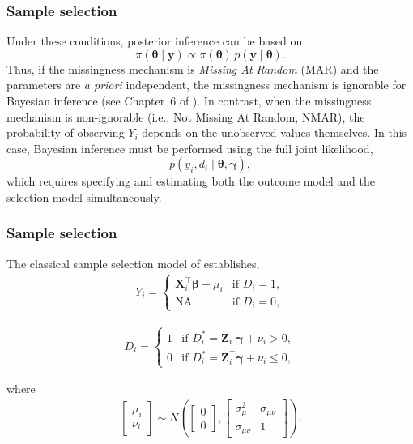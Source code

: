 \documentclass[12pt, compress]{beamer}
\begin{document}
\begin{frame}
	\frametitle{Sample selection}
Under these conditions, posterior inference can be based on
\[
\pi(\boldsymbol{\theta}\mid \mathbf{y}) 
\propto \pi(\boldsymbol{\theta})\, p(\mathbf{y} \mid \boldsymbol{\theta}).
\]
Thus, if the missingness mechanism is \textit{Missing At Random} (MAR) and the parameters are \emph{a priori} independent, the missingness mechanism is ignorable for Bayesian inference (see Chapter~6 of \cite{little2019statistical}).
In contrast, when the missingness mechanism is non-ignorable (i.e., Not Missing At Random, NMAR), the probability of observing $Y_i$ depends on the unobserved values themselves. In this case, Bayesian inference must be performed using the full joint likelihood,
\[
p(y_i, d_i \mid \boldsymbol{\theta},\boldsymbol{\gamma}),
\]
which requires specifying and estimating both the outcome model and the selection model simultaneously.
\end{frame}

\begin{frame}
	\frametitle{Sample selection}
The classical sample selection model of \cite{heckman1979sample} establishes,
\begin{align*}
	Y_i = \begin{cases}
		\mathbf{X}_i^{\top}\boldsymbol{\beta}+\mu_i & \text{if } D_i=1, \\
		\text{NA} & \text{if } D_i=0,
	\end{cases}
\end{align*}

\begin{align*}
	D_i = \begin{cases}
		1 & \text{if } D_i^* = \mathbf{Z}_i^{\top}\boldsymbol{\gamma}+\nu_i > 0, \\
		0 & \text{if } D_i^* = \mathbf{Z}_i^{\top}\boldsymbol{\gamma}+\nu_i \leq 0,
	\end{cases}
\end{align*}

where
\begin{align}
	\begin{bmatrix}
		\mu_i \\[6pt]
		\nu_i
	\end{bmatrix}
	\sim N\!\left(
	\begin{bmatrix}
		0 \\ 0
	\end{bmatrix},
	\begin{bmatrix}
		\sigma^2_{\mu} & \sigma_{\mu\nu} \\
		\sigma_{\mu\nu} & 1
	\end{bmatrix}\right).
\end{align}
\end{frame}
\end{document}
